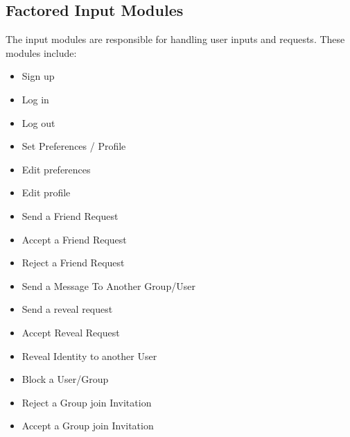 \documentclass[12pt,a4paper]{article}
\begin{document}
\subsection{Factored Input Modules}
The input modules are responsible for handling user inputs and requests. These modules include:

\begin{itemize}
    \item Sign up
    \item Log in
    \item Log out
    \item Set Preferences / Profile
    \item Edit preferences
    \item Edit profile
    \item Send a Friend Request
    \item Accept a Friend Request
    \item Reject a Friend Request
    \item Send a Message To Another Group/User
    \item Send a reveal request
    \item Accept Reveal Request
    \item Reveal Identity to another User
    \item Block a User/Group
    \item Reject a Group join Invitation
    \item Accept a Group join Invitation


\end{itemize}
\end{document}
